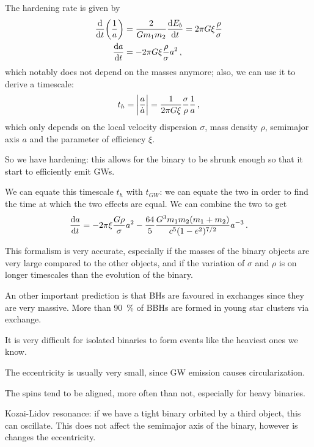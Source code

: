 \documentclass[main.tex]{subfiles}
\begin{document}
The hardening rate is given by 
%
\begin{subequations}
\begin{align}
\dv{}{t} \qty(\frac{1}{a}) &= \frac{2}{G m_1 m_2 } \dv{E_b}{t} = 2 \pi G \xi \frac{\rho}{\sigma }  \\
\dv{a}{t} &= - 2 \pi G \xi \frac{\rho }{\sigma } a^2
\,,
\end{align}
\end{subequations}
%
which notably does not depend on the masses anymore; also, we can use it to derive a timescale: 
%
\begin{align}
t_{h} = \abs{\frac{a}{\dot{a}}} = \frac{1}{2 \pi G \xi } \frac{\sigma}{\rho } \frac{1}{a}
\,,
\end{align}
%
which only depends on the local velocity dispersion \(\sigma \), mass density \(\rho \), semimajor axis \(a\) and the parameter of efficiency \(\xi \). 

So we have hardening: this allows for the binary to be shrunk enough so that it start to efficiently emit GWs. 

We can equate this timescale \(t_h\) with \(t_{GW}\): we can equate the two in order to find the time at which the two effects are equal. We can combine the two to get 
%
\begin{align}
\dv{a}{t} = - 2 \pi \xi \frac{G \rho }{\sigma }a^2 - \frac{64}{5} \frac{G^3 m_1 m_2 (m_1 +m_2 )}{c^{5} (1-e^2)^{7/2}} a^{-3}
\,.
\end{align}

This formalism is very accurate, especially if the masses of the binary objects are very large compared to the other objects, and if the variation of \(\sigma \) and \(\rho \) is on longer timescales than the evolution of the binary. 

An other important prediction is that BHs are favoured in exchanges since they are very massive.
More than \SI{90}{\percent} of BBHs are formed in young star clusters via exchange. 

It is very difficult for isolated binaries to form events like the heaviest ones we know. 

The eccentricity is usually very small, since GW emission causes circularization. 

The spins tend to be aligned, more often than not, especially for heavy binaries. 

Kozai-Lidov resonance: if we have a tight binary orbited by a third object, this can oscillate. 
This does not affect the semimajor axis of the binary, however is changes the eccentricity. 
\end{document}

